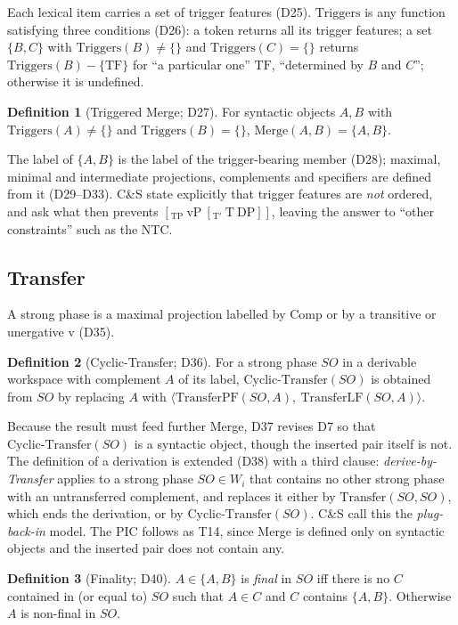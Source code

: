 \documentclass[11pt]{article}
\newcommand{\Def}[1]{D#1}
\newcommand{\Thm}[1]{T#1}
\newcommand{\Merge}{\mathrm{Merge}}
\newcommand{\Triggers}{\mathrm{Triggers}}
\newcommand{\TPF}{\mathrm{TransferPF}}
\newcommand{\TLF}{\mathrm{TransferLF}}
\newcommand{\CT}{\mathrm{Cyclic\text{-}Transfer}}
\newcommand{\pair}[1]{\langle #1 \rangle}
\theoremstyle{definition}
\newtheorem{definition}{Definition}
\theoremstyle{plain}
\begin{document}
Each lexical item carries a set of trigger features (\Def{25}).
$\Triggers$ is any function satisfying three conditions (\Def{26}): a token
returns all its trigger features; a set $\{B,C\}$ with $\Triggers(B)\neq\{\}$
and $\Triggers(C)=\{\}$ returns $\Triggers(B)-\{\mathrm{TF}\}$ for
``a particular one'' $\mathrm{TF}$, ``determined by $B$ and $C$''; otherwise it
is undefined.

\begin{definition}[Triggered Merge; \Def{27}]
For syntactic objects $A,B$ with $\Triggers(A)\neq\{\}$ and
$\Triggers(B)=\{\}$, $\Merge(A,B)=\{A,B\}$.
\end{definition}

\noindent
The label of $\{A,B\}$ is the label of the trigger-bearing member
(\Def{28}); maximal, minimal and intermediate projections, complements and
specifiers are defined from it (\Def{29}--\Def{33}). C\&S state explicitly
that trigger features are \emph{not} ordered, and ask what then prevents
$[_{\mathrm{TP}}\ \mathrm{vP}\ [_{\mathrm{T'}}\ \mathrm{T}\ \mathrm{DP}]]$,
leaving the answer to ``other constraints'' such as the NTC.

\subsection{Transfer}

A strong phase is a maximal projection labelled by Comp or by a transitive or
unergative v (\Def{35}).

\begin{definition}[Cyclic-Transfer; \Def{36}]
For a strong phase $SO$ in a derivable workspace with complement $A$ of its
label, $\CT(SO)$ is obtained from $SO$ by replacing $A$ with
$\pair{\TPF(SO,A),\ \TLF(SO,A)}$.
\end{definition}

\noindent
Because the result must feed further Merge, \Def{37} revises \Def{7} so that
$\CT(SO)$ is a syntactic object, though the inserted pair itself is not. The
definition of a derivation is extended (\Def{38}) with a third clause:
\emph{derive-by-Transfer} applies to a strong phase $SO\in W_i$ that contains
no other strong phase with an untransferred complement, and replaces it either
by $\mathrm{Transfer}(SO,SO)$, which ends the derivation, or by $\CT(SO)$.
C\&S call this the \emph{plug-back-in} model. The PIC follows as \Thm{14},
since Merge is defined only on syntactic objects and the inserted pair does
not contain any.

\begin{definition}[Finality; \Def{40}]
$A \in \{A,B\}$ is \emph{final} in $SO$ iff there is no $C$ contained in (or
equal to) $SO$ such that $A\in C$ and $C$ contains $\{A,B\}$. Otherwise $A$ is
non-final in $SO$.
\end{definition}
\end{document}
